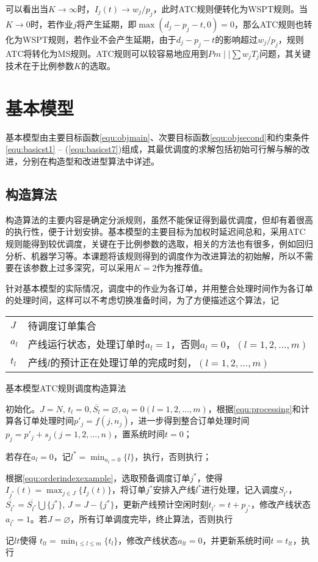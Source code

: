 可以看出当$K \to \infty$时，$I_j(t) \to w_j/p_j$，此时ATC规则便转化为WSPT规则。当$K \to 0$时，若作业$j$将产生延期，即$\max(d_j - p_j -t , 0 ) = 0$，那么ATC规则也转化为WSPT规则，若作业不会产生延期，由于$d_j - p_j - t$的影响超过$w_j/p_j$，规则ATC将转化为MS规则。ATC规则可以较容易地应用到$Pm\mid\mid \sum w_jT_j$问题，其关键技术在于比例参数$K$的选取。

\section{基本模型}
基本模型由主要目标函数\eqref{equ:objmain}、次要目标函数\eqref{equ:objsecond}和约束条件\eqref{equ:basicst1} -- (\ref{equ:basicst7})组成，其最优调度的求解包括初始可行解与解的改进，分别在构造型和改进型算法中详述。
\subsection{构造算法}
构造算法的主要内容是确定分派规则，虽然不能保证得到最优调度，但却有着很高的执行性，便于计划安排。基本模型的主要目标为加权时延迟间总和，采用ATC规则能得到较优调度，关键在于比例参数的选取，相关的方法也有很多，例如回归分析、机器学习等。本课题将该规则得到的调度作为改进算法的初始解，所以不需要在该参数上过多深究，可以采用$K = 2$作为推荐值\cite{bilge2007tabu}。

针对基本模型的实际情况，调度中的作业为各订单，并用整合处理时间作为各订单的处理时间，这样可以不考虑切换准备时间，为了方便描述这个算法，记

\begin{tabular}{ll}
$J$ & 待调度订单集合\\
$a_l$ & 产线运行状态，处理订单时$a_l = 1$，否则$a_l = 0$，$(l = 1,2,...,m)$\\
$t_l$ & 产线$l$的预计正在处理订单的完成时刻，$(l = 1,2,...,m)$
\end{tabular}

\begin{algori}
基本模型ATC规则调度构造算法

\begin{asparaenum}
\renewcommand{\labelenumi}{\bf Step\theenumi~}
\item 初始化。$J = N$, $t_l = 0, \overline{S_l} = \varnothing, a_l=0 (l = 1,2,...,m)$，根据\eqref{equ:processing}和计算各订单处理时间$p'_j = f(j, n_j)$，进一步得到整合订单处理时间$p_j = p'_j + s_j(j = 1,2,...,n)$，置系统时间$t = 0$；
\item 若存在$a_l = 0$，记$l^* = \displaystyle\min_{a_l = 0}\{l\}$，执行，否则执行；
\item 根据\eqref{equ:orderindexexample}，选取预备调度订单$j^*$，使得$I_{j^*}(t) = \displaystyle\max_{j\in J}\{I_j(t)\}$，将订单$j^*$安排入产线$l^*$进行处理，记入调度$S_{l^*}$，$\overline{S_{l^*}}=\overline{S_{l^*}}\bigcup \{j^*\}$, $J = J -\{j^*\}$，更新产线预计空闲时刻$t_{l^*} = t + p_{j^*}$，修改产线状态$a_{l^*} = 1$。若$J = \varnothing$，所有订单调度完毕，终止算法，否则执行
\item 记$lt$使得 $t_{lt} = \displaystyle\min_{1\le l\le m}\{t_l\}$，修改产线状态$a_{lt} = 0$，并更新系统时间$t = t_{lt}$，执行
\end{asparaenum}
\end{algori}



